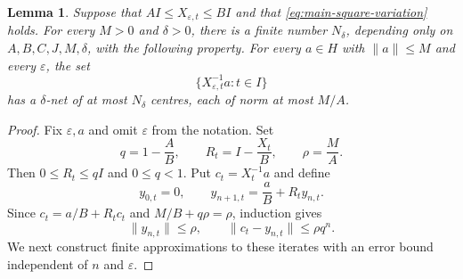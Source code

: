 \documentclass[12pt,reqno,tbtags]{amsart}
\newtheorem{lemma}{Lemma}[section]
\newcommand\norm[1]{\|#1\|}
\newcommand\1{\mathbbm{1}}
\newcommand{\eps}{\varepsilon}
\begin{document}
\begin{lemma}\label{lem:main-inverse-cover}
Suppose that $AI\le X_{\eps,t}\le BI$ and that
\eqref{eq:main-square-variation} holds. For every $M>0$ and $\delta>0$,
there is a finite number $N_\delta$, depending only on $A,B,C,J,M,\delta$,
with the following property. For every $a\in H$ with $\norm{a}\le M$ and
every $\eps$, the set
\begin{equation*}
    \{X_{\eps,t}^{-1}a:t\in I\}
\end{equation*}
has a $\delta$-net of at most $N_\delta$ centres, each of norm at most $M/A$.
\end{lemma}
\begin{proof}
Fix $\eps,a$ and omit $\eps$ from the notation. Set
\begin{equation*}
    q=1-\frac AB,\qquad R_t=I-\frac{X_t}{B},
    \qquad \rho=\frac MA.
\end{equation*}
Then $0\le R_t\le qI$ and $0\le q<1$. Put $c_t=X_t^{-1}a$ and define
\begin{equation}\label{eq:main-iteration}
    y_{0,t}=0,\qquad y_{n+1,t}=\frac aB+R_ty_{n,t}.
\end{equation}
Since $c_t=a/B+R_tc_t$ and $M/B+q\rho=\rho$, induction gives
\begin{equation}\label{eq:main-iteration-error}
    \norm{y_{n,t}}\le\rho,
    \qquad\norm{c_t-y_{n,t}}\le\rho q^n.
\end{equation}
We next construct finite approximations to these iterates with an error bound
independent of $n$ and $\eps$.


\end{proof}
\end{document}
